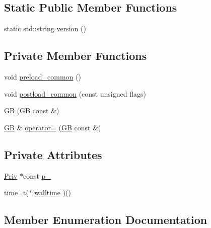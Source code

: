\subsection*{Static Public Member Functions}
\begin{DoxyCompactItemize}
\item 
static std\+::string \hyperlink{classgambatte_1_1GB_a2b1912a87c68f5483ed2272cafdd5648}{version} ()
\end{DoxyCompactItemize}
\subsection*{Private Member Functions}
\begin{DoxyCompactItemize}
\item 
void \hyperlink{classgambatte_1_1GB_adb4e65eec2d20a2f31c6b66e621c7859}{preload\+\_\+common} ()
\item 
void \hyperlink{classgambatte_1_1GB_a9e9b8ed4d0d978cfa6c09c849e704fe7}{postload\+\_\+common} (const unsigned flags)
\item 
\hyperlink{classgambatte_1_1GB_a8f53e9b7823f40e90a0c84a5f088b712}{GB} (\hyperlink{classgambatte_1_1GB}{GB} const \&)
\item 
\hyperlink{classgambatte_1_1GB}{GB} \& \hyperlink{classgambatte_1_1GB_a621e7cd52ce6278c5a521d024b995df5}{operator=} (\hyperlink{classgambatte_1_1GB}{GB} const \&)
\end{DoxyCompactItemize}
\subsection*{Private Attributes}
\begin{DoxyCompactItemize}
\item 
\hyperlink{structgambatte_1_1GB_1_1Priv}{Priv} $\ast$const \hyperlink{classgambatte_1_1GB_a648f96b5ea58e1d6c8013c8897e63218}{p\+\_\+}
\item 
time\+\_\+t($\ast$ \hyperlink{classgambatte_1_1GB_a3b230d27feb2c167823bce8cfc6b02af}{walltime} )()
\end{DoxyCompactItemize}


\subsection{Member Enumeration Documentation}
\mbox{\label{classgambatte_1_1GB_afbfe723d7a5e73582401f77c75d13893}} 
